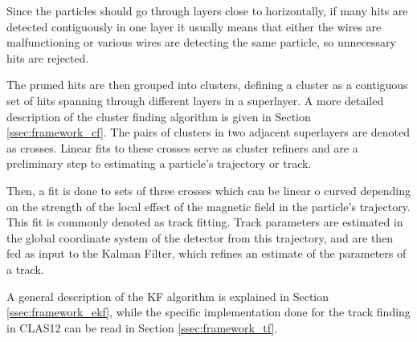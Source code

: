 Since the particles should go through layers close to horizontally, if many hits are detected contiguously in one layer it usually means that either the wires are malfunctioning or various wires are detecting the same particle, so unnecessary hits are rejected.

The pruned hits are then grouped into clusters, defining a cluster as a contiguous set of hits spanning through different layers in a superlayer.
A more detailed description of the cluster finding algorithm is given in Section \ref{ssec:framework_cf}.
The pairs of clusters in two adjacent superlayers are denoted as crosses.
Linear fits to these crosses serve as cluster refiners and are a preliminary step to estimating a particle's trajectory or track.

Then, a fit is done to sets of three crosses which can be linear o curved depending on the strength of the local effect of the magnetic field in the particle's trajectory.
This fit is commonly denoted as track fitting.
Track parameters are estimated in the global coordinate system of the detector from this trajectory, and are then fed as input to the Kalman Filter, which refines an estimate of the parameters of a track.

A general description of the KF algorithm is explained in Section \ref{ssec:framework_ekf}, while the specific implementation done for the track finding in CLAS12 can be read in Section \ref{ssec:framework_tf}.